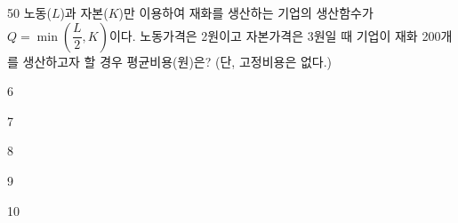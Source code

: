 \begin{question}{50}
노동($L$)과 자본($K$)만 이용하여 재화를 생산하는 기업의 생산함수가 $Q=\min(\dfrac{L}{2},K)$이다. 노동가격은 2원이고 자본가격은 3원일 때 기업이 재화 200개를 생산하고자 할 경우 평균비용(원)은? (단, 고정비용은 없다.)
\begin{choices}
  \item 6
  \item 7
  \item 8
  \item 9
  \item 10
\end{choices}
\end{question}
